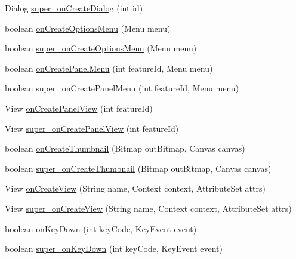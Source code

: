 \begin{DoxyCompactItemize}
\item 
Dialog \hyperlink{classorg_1_1kde_1_1necessitas_1_1origo_1_1_qt_activity_ab00e9c2433f2360c79cae5fc421e1313}{super\-\_\-on\-Create\-Dialog} (int id)
\item 
boolean \hyperlink{classorg_1_1kde_1_1necessitas_1_1origo_1_1_qt_activity_af600cf24cf2183b0695e6d1642641682}{on\-Create\-Options\-Menu} (Menu menu)
\item 
boolean \hyperlink{classorg_1_1kde_1_1necessitas_1_1origo_1_1_qt_activity_a03efe8bfdd9de88bbd6bbd8ecfdf400c}{super\-\_\-on\-Create\-Options\-Menu} (Menu menu)
\item 
boolean \hyperlink{classorg_1_1kde_1_1necessitas_1_1origo_1_1_qt_activity_abb5532ee05bb4c8d329a83a86e4eaeab}{on\-Create\-Panel\-Menu} (int feature\-Id, Menu menu)
\item 
boolean \hyperlink{classorg_1_1kde_1_1necessitas_1_1origo_1_1_qt_activity_a39f358f47ca3880ccb597c60771980c1}{super\-\_\-on\-Create\-Panel\-Menu} (int feature\-Id, Menu menu)
\item 
View \hyperlink{classorg_1_1kde_1_1necessitas_1_1origo_1_1_qt_activity_aab02758f23d698bac8b05dbc30045442}{on\-Create\-Panel\-View} (int feature\-Id)
\item 
View \hyperlink{classorg_1_1kde_1_1necessitas_1_1origo_1_1_qt_activity_a248b7566d9ec8f6e52a628dac640d51c}{super\-\_\-on\-Create\-Panel\-View} (int feature\-Id)
\item 
boolean \hyperlink{classorg_1_1kde_1_1necessitas_1_1origo_1_1_qt_activity_afb670c873c82d438955ba501b097ffb1}{on\-Create\-Thumbnail} (Bitmap out\-Bitmap, Canvas canvas)
\item 
boolean \hyperlink{classorg_1_1kde_1_1necessitas_1_1origo_1_1_qt_activity_a023d22633c6b4e9c92c2ed2bca99fa65}{super\-\_\-on\-Create\-Thumbnail} (Bitmap out\-Bitmap, Canvas canvas)
\item 
View \hyperlink{classorg_1_1kde_1_1necessitas_1_1origo_1_1_qt_activity_ad7742dcb081577bd0d7904e680c68fde}{on\-Create\-View} (String name, Context context, Attribute\-Set attrs)
\item 
View \hyperlink{classorg_1_1kde_1_1necessitas_1_1origo_1_1_qt_activity_a775fe4e300f5d24d78fcf8f78a6d5ead}{super\-\_\-on\-Create\-View} (String name, Context context, Attribute\-Set attrs)
\item 
boolean \hyperlink{classorg_1_1kde_1_1necessitas_1_1origo_1_1_qt_activity_a127bfd86dedd0a49072db45801a395d3}{on\-Key\-Down} (int key\-Code, Key\-Event event)
\item 
boolean \hyperlink{classorg_1_1kde_1_1necessitas_1_1origo_1_1_qt_activity_a584995d809a6af751dadfe50f09cfbf0}{super\-\_\-on\-Key\-Down} (int key\-Code, Key\-Event event)

\end{DoxyCompactItemize}
